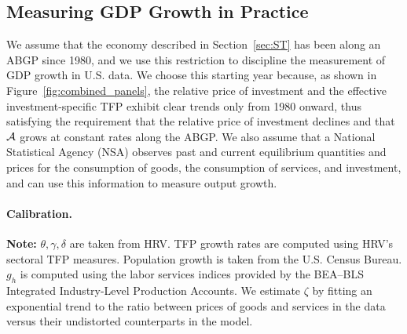 \documentclass[12pt,a4paper]{article}
\begin{document}
\subsection{Measuring GDP Growth in Practice}\label{sec:calibration}

We assume that the economy described in Section~\ref{sec:ST} has been along an ABGP since 1980, and we use this restriction to discipline the measurement of GDP growth in U.S. data.
We choose this starting year because, as shown in Figure~\ref{fig:combined_panels},  
the relative price of investment and the effective investment-specific TFP exhibit clear trends only from 1980 onward,  
thus satisfying the requirement that the relative price of investment declines  
and that $\cal A$ grows at constant rates along the ABGP.
We also assume that  a National Statistical Agency (NSA) observes past and current equilibrium quantities and prices for the consumption of goods, the consumption of services, and investment, and can use this information to measure output growth. %



\paragraph{Calibration.}


\begin{table}[!t]
\caption{Calibrated Parameter Values}
\centering
\begin{threeparttable} 
\renewcommand{\TPTminimum}{\linewidth}
\label{tab:cal_HRV}
\begin{tablenotes} 
\footnotesize
\item \textbf{Note:} $\theta, \gamma, \delta$ are taken from HRV. TFP growth rates are computed using HRV's sectoral TFP measures. Population growth is taken from the U.S. Census Bureau. $g_{h}$ is computed using the labor services indices provided by the BEA–BLS Integrated Industry-Level Production Accounts. We estimate $\zeta$ by fitting an exponential trend to the ratio between prices of goods and services in the data versus their undistorted counterparts in the model.
\end{tablenotes} 
\end{threeparttable} 
\label{tab:calibration}
\end{table}
\end{document}
